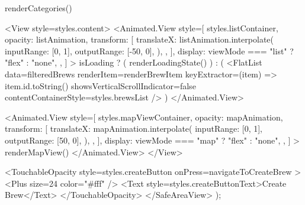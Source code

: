 {      {renderCategories()}
      
      <View style={styles.content}>
        <Animated.View
          style={[
            styles.listContainer,
            {
              opacity: listAnimation,
              transform: [
                {
                  translateX: listAnimation.interpolate({
                    inputRange: [0, 1],
                    outputRange: [-50, 0],
                  }),
                },
              ],
              display: viewMode === "list" ? "flex" : "none",
            },
          ]}
        >
          {isLoading ? (
            renderLoadingState()
          ) : (
            <FlatList
              data={filteredBrews}
              renderItem={renderBrewItem}
              keyExtractor={(item) => item.id.toString()}
              showsVerticalScrollIndicator={false}
              contentContainerStyle={styles.brewsList}
            />
          )}
        </Animated.View>
        
        <Animated.View
          style={[
            styles.mapViewContainer,
            {
              opacity: mapAnimation,
              transform: [
                {
                  translateX: mapAnimation.interpolate({
                    inputRange: [0, 1],
                    outputRange: [50, 0],
                  }),
                },
              ],
              display: viewMode === "map" ? "flex" : "none",
            },
          ]}
        >
          {renderMapView()}
        </Animated.View>
      </View>
      
      <TouchableOpacity
        style={styles.createButton}
        onPress={navigateToCreateBrew}
      >
        <Plus size={24} color="#fff" />
        <Text style={styles.createButtonText}>Create Brew</Text>
      </TouchableOpacity>
    </SafeAreaView>
  );
}

